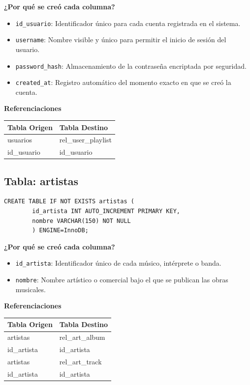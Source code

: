 \documentclass[11pt]{article}
\begin{document}
	\noindent\textbf{¿Por qué se creó cada columna?}
	\begin{itemize}[noitemsep,topsep=2pt]
		\item \texttt{id\_usuario}: Identificador único para cada cuenta registrada en el sistema.
		\item \texttt{username}: Nombre visible y único para permitir el inicio de sesión del usuario.
		\item \texttt{password\_hash}: Almacenamiento de la contraseña encriptada por seguridad.
		\item \texttt{created\_at}: Registro automático del momento exacto en que se creó la cuenta.
	\end{itemize}
	
	\vspace{0.3cm}
	\noindent\textbf{Referenciaciones} \\[0.3em]
	\begin{tabular}{|l|l|}
		\hline
		\textbf{Tabla Origen} & \textbf{Tabla Destino} \\
		\hline
		usuarios & rel\_user\_playlist \\
		id\_usuario & id\_usuario \\
		\hline
	\end{tabular}
	
	\vspace{0.5cm}
	
	\subsection{Tabla: artistas}
	\begin{lstlisting}[style=sqlstyle]
		CREATE TABLE IF NOT EXISTS artistas (
		id_artista INT AUTO_INCREMENT PRIMARY KEY,
		nombre VARCHAR(150) NOT NULL
		) ENGINE=InnoDB;
	\end{lstlisting}
	
	\noindent\textbf{¿Por qué se creó cada columna?}
	\begin{itemize}[noitemsep,topsep=2pt]
		\item \texttt{id\_artista}: Identificador único de cada músico, intérprete o banda.
		\item \texttt{nombre}: Nombre artístico o comercial bajo el que se publican las obras musicales.
	\end{itemize}
	
	\vspace{0.3cm}
	\noindent\textbf{Referenciaciones} \\[0.3em]
	\begin{tabular}{|l|l|}
		\hline
		\textbf{Tabla Origen} & \textbf{Tabla Destino} \\
		\hline
		artistas & rel\_art\_album \\
		id\_artista & id\_artista \\
		\hline
		artistas & rel\_art\_track \\
		id\_artista & id\_artista \\
		\hline
	\end{tabular}
	
\end{document}
